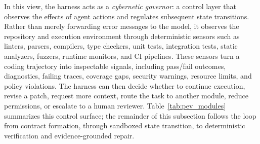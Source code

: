 \documentclass{llmxive}
\begin{document}
In this view, the harness acts as a \emph{cybernetic governor}: a control layer that observes the effects of agent actions and regulates subsequent state transitions. Rather than merely forwarding error messages to the model, it observes the repository and execution environment through deterministic sensors such as linters, parsers, compilers, type checkers, unit tests, integration tests, static analyzers, fuzzers, runtime monitors, and CI pipelines. These sensors turn a coding trajectory into inspectable signals, including pass/fail outcomes, diagnostics, failing traces, coverage gaps, security warnings, resource limits, and policy violations. The harness can then decide whether to continue execution, revise a patch, request more context, route the task to another module, reduce permissions, or escalate to a human reviewer. Table~\ref{tab:pev_modules} summarizes this control surface; the remainder of this subsection follows the loop from contract formation, through sandboxed state transition, to deterministic verification and evidence-grounded repair.
\end{document}
